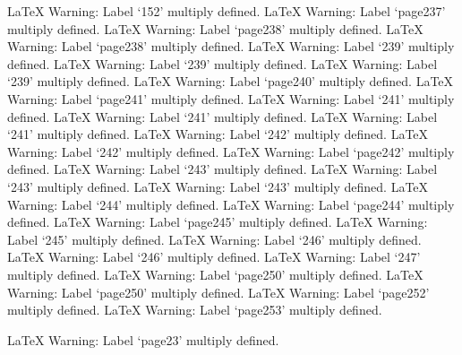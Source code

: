 LaTeX Warning: Label `152' multiply defined.
LaTeX Warning: Label `page237' multiply defined.
LaTeX Warning: Label `page238' multiply defined.
LaTeX Warning: Label `page238' multiply defined.
LaTeX Warning: Label `239' multiply defined.
LaTeX Warning: Label `239' multiply defined.
LaTeX Warning: Label `239' multiply defined.
LaTeX Warning: Label `page240' multiply defined.
LaTeX Warning: Label `page241' multiply defined.
LaTeX Warning: Label `241' multiply defined.
LaTeX Warning: Label `241' multiply defined.
LaTeX Warning: Label `241' multiply defined.
LaTeX Warning: Label `242' multiply defined.
LaTeX Warning: Label `242' multiply defined.
LaTeX Warning: Label `page242' multiply defined.
LaTeX Warning: Label `243' multiply defined.
LaTeX Warning: Label `243' multiply defined.
LaTeX Warning: Label `243' multiply defined.
LaTeX Warning: Label `244' multiply defined.
LaTeX Warning: Label `page244' multiply defined.
LaTeX Warning: Label `page245' multiply defined.
LaTeX Warning: Label `245' multiply defined.
LaTeX Warning: Label `246' multiply defined.
LaTeX Warning: Label `246' multiply defined.
LaTeX Warning: Label `247' multiply defined.
LaTeX Warning: Label `page250' multiply defined.
LaTeX Warning: Label `page250' multiply defined.
LaTeX Warning: Label `page252' multiply defined.
LaTeX Warning: Label `page253' multiply defined.


LaTeX Warning: Label `page23' multiply defined.

